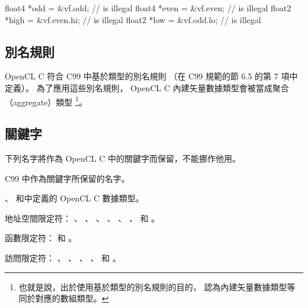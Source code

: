 float4	*odd = &vf.odd;		// is illegal
float4	*even = &vf.even;	// is illegal
float2	*high = &vf.even.hi;	// is illegal
float2	*low = &vf.odd.lo;	// is illegal
\stopclc

\subsection{別名規則}

OpenCL C  符合 C99 中基於類型的別名規則
（在 C99 規範的節 6.5 的第 7 項中定義）。
為了應用這些別名規則， OpenCL C 內建矢量數據類型會被當成聚合（aggregate）類型
\footnote{也就是說，出於使用基於類型的別名規則的目的，
認為內建矢量數據類型等同於對應的數組類型。}。

\subsection{關鍵字}

下列名字將作為 OpenCL C 中的關鍵字而保留，不能挪作他用。
\startigBase
\item C99 中作為關鍵字所保留的名字。

\item {}、
和中定義的 OpenCL C 數據類型。

\item 地址空間限定符：
 、 、 、 、
 、 、  和 。

\item 函數限定符：  和 。

\item 訪問限定符：
 、 、 、 、
  和 。
\stopigBase

